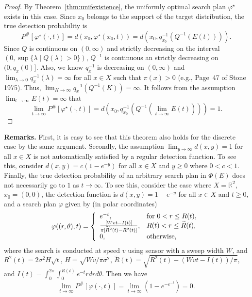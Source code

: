 \documentclass[12pt]{article}
\theoremstyle{plain}
\theoremstyle{definition}
\theoremstyle{remark}
\begin{document}
\begin{proof}
By Theorem~\ref{thm:unifexistence}, the uniformly optimal search plan $\varphi^\star$ exists in this case.   Since $x_0$ belongs to the support of the target distribution, the true detection probability is 
\[
P^{\#}[\varphi^\star(\cdot, t)]=d(x_0, \varphi^\star(x_0, t))=d(x_0, q_{x_0}^{-1}(Q^{-1}(E(t)))).
\]
Since $Q$ is continuous on $(0, \infty)$ and strictly decreasing on the interval $(0, \sup\{\lambda\mid Q(\lambda)>0\})$, $Q^{-1}$ is continuous an strictly decreasing on $(0, q_x(0)]$.  Also,  we know $q_x^{-1}$ is decreasing on $(0, \infty)$ and $\lim_{\lambda \rightarrow 0} q_x^{-1}(\lambda)=\infty$ for all $x\in X$ such that $\pi(x)>0$ (e.g.,  Page~47 of Stone 1975). Thus, $\lim_{K\rightarrow \infty}q_x^{-1}(Q^{-1}(K))=\infty$.  It follows from the assumption $\lim_{t\rightarrow \infty}E(t)=\infty$ that 
\[
\lim_{t \rightarrow \infty}P^{\#}[\varphi^\star(\cdot, t)]=d\left(x_0, q_{x_0}^{-1}\left(Q^{-1}\left(\lim_{t \rightarrow \infty}E(t)\right)\right)\right)=1.
\]
\end{proof}
\noindent \textbf{Remarks.} First,  it is easy to see that this theorem also holds for the discrete case by the same argument. Secondly,  the assumption $\lim_{y\rightarrow \infty} d(x, y)=1$ for all $x\in X$ is not automatically satisfied by a regular detection function. To see this, consider $d(x, y)=c(1-e^{-y})$ for all $x\in X$ and $y\geq 0$ where $0<c<1$.  Finally,  the true detection probability of an arbitrary search plan in $\Phi(E)$ does not necessarily go to  $1$ as $t\rightarrow \infty$. To see this, consider the case where $X=\mathbb{R}^2$,  $x_0=(0, 0)$, the detection function is $d(x, y)=1-e^{-y}$ for all $x\in X$ and $t\geq 0$,  and a search plan $\varphi$ given by (in polar coordinates)
\[
\varphi((r, \theta), t)=\left\{
		                           \begin{array}{ll}
		                           e^{-t},& \hbox{for $0<r\leq R(t)$,} \\
					\frac{[Wvt-I(t)]}{\pi[\widetilde{R}^2(t)-R^2(t)]},  & \hbox{$R(t)<r\leq \widetilde{R}(t)$,} \\
					0,  & \hbox{otherwise,} 
		                          \end{array}
		                         \right.
\]
where the search is conducted at speed $v$ using sensor with a sweep width $W$, and $R^2(t)=2\sigma^2H\sqrt{t}$, $H=\sqrt{Wv/\pi \sigma^2}$,  $\widetilde{R}(t)=\sqrt{R^2(t)+(Wvt-I(t))/\pi}$,  and $I(t)=\int_0^{2\pi}\int_0^{R(t)} e^{-t}rdrd\theta$. Then we have
\[
\lim_{t\rightarrow \infty} P^{\#}[\varphi(\cdot, t)]=\lim_{t\rightarrow \infty} \left(1-e^{-e^{-t}}\right)=0.
\]
\end{document}
